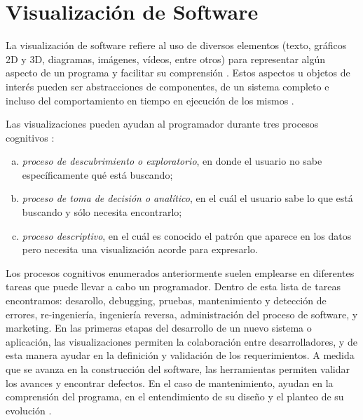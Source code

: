 \section{Visualización de Software}

La visualización de software refiere al uso de diversos elementos (texto, 
gráficos 2D y 3D, diagramas, imágenes, vídeos, entre otros) para representar algún
aspecto de un programa y facilitar su comprensión \cite{PetreDeQuincey06,Chen06,GomezHenriquez01}.
Estos aspectos u objetos de interés pueden ser abstracciones de componentes, de
un sistema completo e incluso del comportamiento en tiempo en ejecución de los
mismos \cite{TeysereCampo09}.

Las visualizaciones pueden ayudan al programador durante tres procesos cognitivos
\cite{ButlerAlmond93}:
\begin{enumerate}[a)]
    \item \textit{proceso de descubrimiento o exploratorio}, en donde el usuario no
    sabe específicamente qué está buscando;
    \item \textit{proceso de toma de decisión o analítico}, en el cuál el usuario sabe lo que
    está buscando y sólo necesita encontrarlo;
    \item \textit{proceso descriptivo}, en el cuál es conocido el patrón que aparece en los
    datos pero necesita una visualización acorde para expresarlo.
\end{enumerate}

Los procesos cognitivos enumerados anteriormente suelen emplearse en diferentes tareas 
que puede llevar a cabo un programador.
Dentro de esta lista de tareas \cite{MalleticMarcusCollard02} encontramos: desarollo,
debugging, pruebas, mantenimiento y detección de errores, re-ingeniería, ingeniería reversa,
administración del proceso de software, y marketing.
En las primeras etapas del desarrollo de un nuevo sistema o aplicación, las visualizaciones
permiten la colaboración entre desarrolladores, y de esta manera ayudar en la definición y 
validación de los requerimientos.
A medida que se avanza en la construcción del software, las herramientas permiten validar
los avances y encontrar defectos.
En el caso de mantenimiento, ayudan en la comprensión del programa, en el entendimiento 
de su diseño y el planteo de su evolución \cite{PetreDeQuincey06}.

